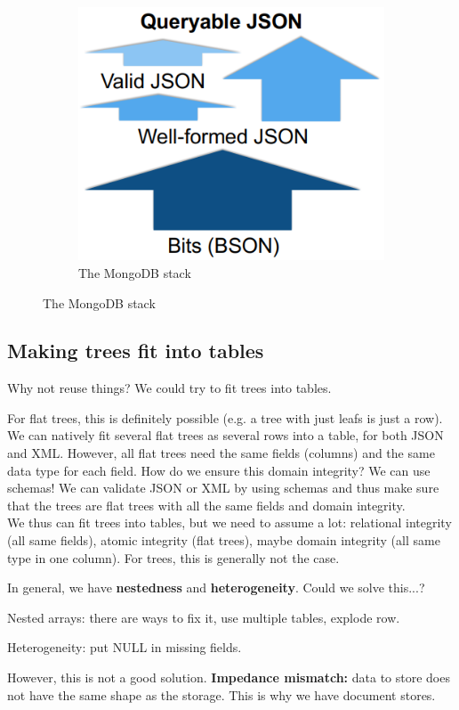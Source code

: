 \documentclass[11pt,oneside,a4paper]{article}
\begin{document}
\begin{figure}[hb!]
	\begin{subfigure}[t]{.3\textwidth}
		\centering
		\includegraphics[width=0.6\linewidth]{figures/docstores_mongodb_stack}
		\caption{The MongoDB stack}
	\end{subfigure}
\end{figure}

\subsection{Making trees fit into tables}

Why not reuse things? We could try to fit trees into tables.

For flat trees, this is definitely possible (e.g. a tree with just leafs is just a row). We can natively fit several flat trees as several rows into a table, for both JSON and XML. However, all flat trees need the same fields (columns) and the same data type for each field. How do we ensure this domain integrity? We can use schemas! We can validate JSON or XML by using schemas and thus make sure that the trees are flat trees with all the same fields and domain integrity.\\

We thus can fit trees into tables, but we need to assume a lot: relational integrity (all same fields), atomic integrity (flat trees), maybe domain integrity (all same type in one column). For trees, this is generally not the case.

In general, we have \textbf{nestedness} and \textbf{heterogeneity}. Could we solve this...?

Nested arrays: there are ways to fix it, use multiple tables, explode row.

Heterogeneity: put NULL in missing fields.

However, this is not a good solution. \textbf{Impedance mismatch:} data to store does not have the same shape as the storage. This is why we have document stores.
\end{document}
